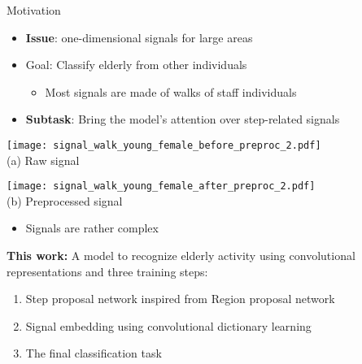 \begin{frame}{Motivation}{}
\begin{itemize}
    \item \textbf{Issue}: one-dimensional signals for large areas
    \item Goal: Classify elderly from other individuals
    \begin{itemize}
        \item Most signals are made of walks of staff individuals
    \end{itemize}
    \item \textbf{Subtask}: Bring the model's attention over step-related signals
\end{itemize}

\pause
    \begin{minipage}{\linewidth}
        \centering
        \begin{minipage}{0.49\linewidth}
            \centering
            \texttt{[image: signal\_walk\_young\_female\_before\_preproc\_2.pdf]}\\
            {\small (a)\; Raw signal}
        \end{minipage}
        \begin{minipage}{0.49\linewidth}
            \centering
            \texttt{[image: signal\_walk\_young\_female\_after\_preproc\_2.pdf]}\\
            {\small (b)\; Preprocessed signal}
        \end{minipage}
    \end{minipage}
\begin{itemize}
    \item Signals are rather complex
\end{itemize}

    \textbf{This work:} A model to recognize elderly activity using convolutional representations and three training steps:
        \begin{enumerate}
            \item Step proposal network inspired from Region proposal network
            \item Signal embedding using convolutional dictionary learning
            \item The final classification task
        \end{enumerate}


\end{frame}

